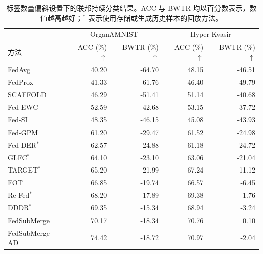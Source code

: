 \begin{table}[!htbp]
\centering
\setlength{\belowcaptionskip}{5pt}
\caption{标签数量偏斜设置下的联邦持续分类结果。ACC 与 BWTR 均以百分数表示，数值越高越好；$^{\ast}$ 表示使用存储或生成历史样本的回放方法。}
\label{tab:fedsubmerge-main-other}
\linespread{1}\selectfont
\fontsize{10.0bp}{12.5bp}\selectfont
\setlength{\tabcolsep}{5pt}
\renewcommand{\arraystretch}{1.10}
\begin{tabular*}{\textwidth}{@{\extracolsep{\fill}}lrrrr@{}}
\toprule
 & \multicolumn{2}{c}{OrganAMNIST} & \multicolumn{2}{c}{Hyper-Kvasir} \\
\cmidrule(lr){2-3}\cmidrule(lr){4-5}
方法 & \shortstack{ACC\\(\%) $\uparrow$} & \shortstack{BWTR\\(\%) $\uparrow$} & \shortstack{ACC\\(\%) $\uparrow$} & \shortstack{BWTR\\(\%) $\uparrow$} \\
\midrule
FedAvg & 40.20 & -64.70 & 48.15 & -46.51 \\
FedProx & 41.33 & -61.76 & 46.40 & -49.79 \\
SCAFFOLD & 46.29 & -51.41 & 51.14 & -40.68 \\
Fed-EWC & 52.59 & -42.68 & 53.15 & -37.72 \\
Fed-SI & 48.35 & -46.15 & 45.08 & -43.93 \\
Fed-GPM & 61.20 & -29.47 & 61.52 & -24.98 \\
Fed-DER$^{\ast}$ & 62.57 & -24.88 & 61.18 & -24.72 \\
GLFC$^{\ast}$ & 64.10 & -23.10 & 63.06 & -21.04 \\
TARGET$^{\ast}$ & 65.20 & -21.99 & 67.24 & -11.12 \\
FOT & 66.85 & -19.74 & 66.57 & -6.45 \\
Re-Fed$^{\ast}$ & 68.20 & -17.89 & 69.38 & -1.76 \\
DDDR$^{\ast}$ & 69.35 & -15.34 & 68.94 & -3.24 \\
\midrule
FedSubMerge & 70.17 & -18.34 & 70.76 & 0.10 \\
FedSubMerge-AD & 74.42 & -18.72 & 70.97 & -2.04 \\
\bottomrule
\end{tabular*}
\end{table}

